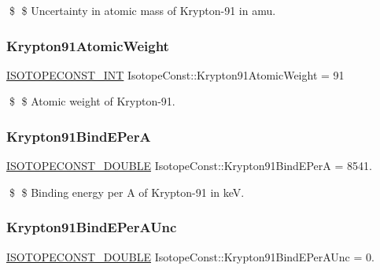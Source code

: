 \$ \$ Uncertainty in atomic mass of Krypton-\/91 in amu. \mbox{\label{group___isotope_const-_krypton-_kr91_gab2102df86c79316ef941f57fe92dbc5f}} 
\subsubsection{\texorpdfstring{Krypton91\+Atomic\+Weight}{Krypton91AtomicWeight}}
{\footnotesize\ttfamily \mbox{\hyperlink{group___isotope_const-_macros_ga5f18360b3e99483a35c32d789e62621c}{I\+S\+O\+T\+O\+P\+E\+C\+O\+N\+S\+T\+\_\+\+I\+NT}} Isotope\+Const\+::\+Krypton91\+Atomic\+Weight = 91}

\$ \$ Atomic weight of Krypton-\/91. \mbox{\label{group___isotope_const-_krypton-_kr91_gac75509da8abe3c9b1418b62552a45e8f}} 
\subsubsection{\texorpdfstring{Krypton91\+Bind\+E\+PerA}{Krypton91BindEPerA}}
{\footnotesize\ttfamily \mbox{\hyperlink{group___isotope_const-_macros_ga8f45a7272ce02c0b4c65c44636ed719a}{I\+S\+O\+T\+O\+P\+E\+C\+O\+N\+S\+T\+\_\+\+D\+O\+U\+B\+LE}} Isotope\+Const\+::\+Krypton91\+Bind\+E\+PerA = 8541.}

\$ \$ Binding energy per A of Krypton-\/91 in keV. \mbox{\label{group___isotope_const-_krypton-_kr91_ga61556a2b5a140ed8f20f08e3ffa8a089}} 
\subsubsection{\texorpdfstring{Krypton91\+Bind\+E\+Per\+A\+Unc}{Krypton91BindEPerAUnc}}
{\footnotesize\ttfamily \mbox{\hyperlink{group___isotope_const-_macros_ga8f45a7272ce02c0b4c65c44636ed719a}{I\+S\+O\+T\+O\+P\+E\+C\+O\+N\+S\+T\+\_\+\+D\+O\+U\+B\+LE}} Isotope\+Const\+::\+Krypton91\+Bind\+E\+Per\+A\+Unc = 0.}

